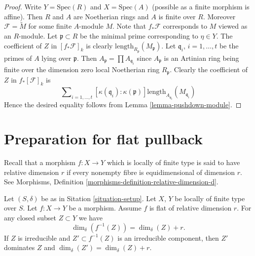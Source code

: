 \begin{proof}
\medskip\noindent
Write $Y = \text{Spec}(R)$ and $X = \text{Spec}(A)$ (possible as
a finite morphism is affine).
Then $R$ and $A$ are Noetherian rings and $A$ is finite over $R$.
Moreover $\mathcal{F} = \widetilde{M}$ for some finite $A$-module
$M$. Note that $f_*\mathcal{F}$ corresponds to $M$ viewed as an $R$-module.
Let $\mathfrak p \subset R$ be the minimal prime corresponding
to $\eta \in Y$. The coefficient of $Z$ in $[f_*\mathcal{F}]_k$
is clearly $\text{length}_{R_{\mathfrak p}}(M_{\mathfrak p})$.
Let $\mathfrak q_i$, $i = 1, \ldots, t$ be the primes of $A$
lying over $\mathfrak p$. Then $A_{\mathfrak p} = \prod A_{\mathfrak q_i}$
since $A_{\mathfrak p}$ is an Artinian ring being finite over the
dimension zero local Noetherian ring $R_{\mathfrak p}$.
Clearly the coefficient of $Z$ in $f_*[\mathcal{F}]_k$ is
$$
\sum\nolimits_{i = 1, \ldots, t}
[\kappa(\mathfrak q_i) : \kappa(\mathfrak p)]
\text{length}_{A_{\mathfrak q_i}}(M_{\mathfrak q_i})
$$
Hence the desired equality follows from Lemma \ref{lemma-pushdown-module}.
\end{proof}




















\section{Preparation for flat pullback}
\label{section-preparation-flat-pullback}


\noindent
Recall that a morphism $f : X \to Y$ which is locally of finite type
is said to have relative dimension $r$ if every nonempty fibre
is equidimensional of dimension $r$. See
Morphisms, Definition \ref{morphisms-definition-relative-dimension-d}.

\begin{lemma}
\label{lemma-flat-inverse-image-dimension}
Let $(S, \delta)$ be as in Sitation \ref{situation-setup}.
Let $X$, $Y$ be locally of finite type over $S$.
Let $f : X \to Y$ be a morphism.
Assume $f$ is flat of relative dimension $r$.
For any closed subset $Z \subset Y$ we have
$$
\dim_\delta(f^{-1}(Z)) = \dim_\delta(Z) + r.
$$
If $Z$ is irreducible and $Z' \subset f^{-1}(Z)$ is an irreducible
component, then $Z'$ dominates $Z$ and
$\dim_\delta(Z') = \dim_\delta(Z) + r$.
\end{lemma}

